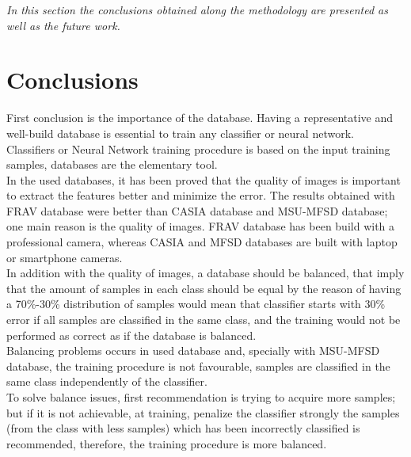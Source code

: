 
\begin{small}
\emph{In this section the conclusions obtained along the methodology are presented as well as the future work.\\}
\end{small}

\section{Conclusions}
First conclusion is the importance of the database. Having a representative and well-build database is essential to train any classifier or neural network.\\

Classifiers or Neural Network training procedure is based on the input training samples, databases are the elementary tool.\\

In the used databases, it has been proved that the quality of images is important to extract the features better and minimize the error. The results obtained with FRAV database were better than CASIA database and MSU-MFSD database; one main reason is the quality of images. FRAV database has been build with a professional camera, whereas CASIA and MFSD databases are built with laptop or smartphone cameras.\\

In addition with the quality of images, a database should be balanced, that imply that the amount of samples in each class should be equal by the reason of having a 70\%-30\% distribution of samples would mean that classifier starts with 30\% error if all samples are classified in the same class, and the training would not be performed as correct as if the database is balanced.\\

Balancing problems occurs in used database and, specially with MSU-MFSD database, the training procedure is not favourable, samples are classified in the same class independently of the classifier.\\

To solve balance issues, first recommendation is trying to acquire more samples; but if it is not achievable, at training, penalize the classifier strongly the samples (from the class with less samples) which has been incorrectly classified is recommended, therefore, the training procedure is more balanced.\\
 
